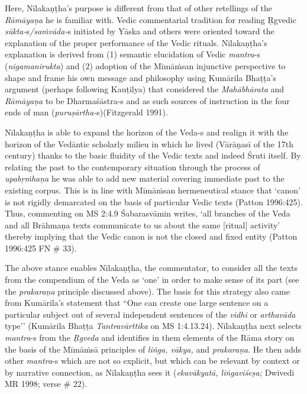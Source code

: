 Here, Nīlakaṇṭha’s purpose is different from that of other retellings of the \textit{Rāmāyaṇa} he is familiar with. Vedic commentarial tradition for reading Ṛgvedic \textit{sūkta-}s\textit{/saṁvāda-}s initiated by Yāska and others were oriented toward the explanation of the proper performance of the Vedic rituals. Nīlakaṇṭha's explanation is derived from (1) semantic elucidation of Vedic \textit{mantra}-s (\textit{nigamanirukta}) and (2) adoption of the Mīmāṁsan injunctive perspective to shape and frame his own message and philosophy using Kumārila Bhaṭṭa’s argument (perhaps following Kauṭilya) that considered the \textit{Mahābhārata} and \textit{Rāmāyaṇa} to be Dharmaśāstra-s and as such sources of instruction in the four ends of man (\textit{puruṣārtha-}s)(Fitzgerald 1991).

Nīlakaṇṭha is able to expand the horizon of the Veda-s and realign it with the horizon of the Vedāntic scholarly milieu in which he lived (Vārāṇasī of the 17th century) thanks to the basic fluidity of the Vedic texts and indeed Śruti itself. By relating the past to the contemporary situation through the process of \textit{upabṛṁhaṇa} he was able to add new material covering immediate past to the existing corpus. This is in line with Mīmāṁsan hermeneutical stance that ‘canon’ is not rigidly demarcated on the basis of particular Vedic texts (Patton 1996:425). Thus, commenting on MS 2:4.9 Śabarasvāmin writes, ‘all branches of the Veda and all Brāhmaṇa texts communicate to us about the same [ritual] activity’ thereby implying that the Vedic canon is not the closed and fixed entity (Patton 1996:425 FN \# 33).

The above stance enables Nīlakaṇṭha, the commentator, to consider all the texts from the compendium of the Veda as ‘one’ in order to make sense of its part (see the \textit{prakaraṇa} principle discussed above). The basis for this strategy also came from Kumārila’s statement that “One can create one large sentence on a particular subject out of several independent sentences of the \textit{vidhi} or \textit{arthavāda} type’’ (Kumārila Bhaṭṭa \textit{Tantravārttika} on MS 1:4.13.24). Nīlakaṇṭha next selects \textit{mantra}-s from the \textit{Ṛgveda} and identifies in them elements of the Rāma story on the basis of the Mīmāṁsā principles of \textit{liṅga, vākya,} and \textit{prakaraṇa}. He then adds other \textit{mantra}-s which are not so explicit, but which can be relevant by context or by narrative connection, as Nīlakaṇṭha sees it (\textit{ekavākyatā, liṅgaviśeṣa;} Dwivedi MR 1998; verse \# 22).


